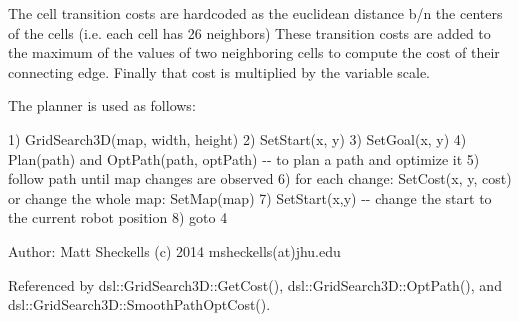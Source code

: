 \-The cell transition costs are hardcoded as the euclidean distance b/n the centers of the cells (i.\-e. each cell has 26 neighbors) \-These transition costs are added to the maximum of the values of two neighboring cells to compute the cost of their connecting edge. \-Finally that cost is multiplied by the variable scale.

\-The planner is used as follows\-:

1) \-Grid\-Search3\-D(map, width, height) 2) \-Set\-Start(x, y) 3) \-Set\-Goal(x, y) 4) \-Plan(path) and \-Opt\-Path(path, opt\-Path) -\/-\/ to plan a path and optimize it 5) follow path until map changes are observed 6) for each change\-: \-Set\-Cost(x, y, cost) or change the whole map\-: \-Set\-Map(map) 7) \-Set\-Start(x,y) -\/-\/ change the start to the current robot position 8) goto 4

\-Author\-: \-Matt \-Sheckells (c) 2014 msheckells(at)jhu.\-edu 

\-Referenced by dsl\-::\-Grid\-Search3\-D\-::\-Get\-Cost(), dsl\-::\-Grid\-Search3\-D\-::\-Opt\-Path(), and dsl\-::\-Grid\-Search3\-D\-::\-Smooth\-Path\-Opt\-Cost().

